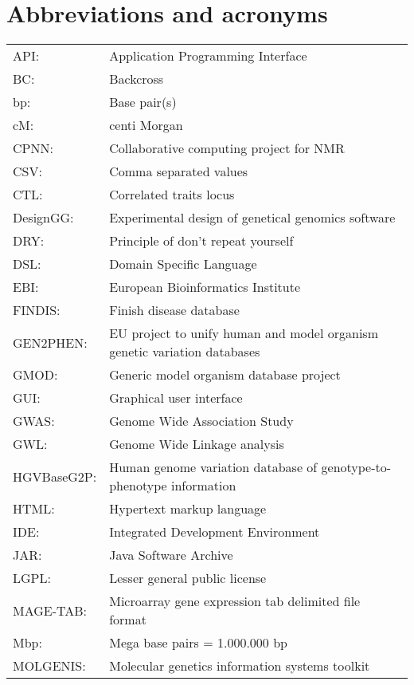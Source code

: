 \documentclass[8pt, twoside]{book}
\begin{document}
\section*{Abbreviations and acronyms}
{\footnotesize
\begin{tabular}{ l l }
API:         & Application Programming Interface\\
BC:          & Backcross \\
bp:          & Base pair(s) \\
cM:          & centi Morgan \\
CPNN:        & Collaborative computing project for NMR\\
CSV:         & Comma separated values\\
CTL:         & Correlated traits locus \\
DesignGG:    & Experimental design of genetical genomics software\\
DRY:         & Principle of don't repeat yourself\\
DSL:         & Domain Specific Language\\
EBI:         & European Bioinformatics Institute\\
FINDIS:      & Finish disease database\\
GEN2PHEN:    & EU project to unify human and model organism genetic variation databases\\
GMOD:        & Generic model organism database project\\
GUI:         & Graphical user interface\\
GWAS:        & Genome Wide Association Study\\
GWL:         & Genome Wide Linkage analysis\\
HGVBaseG2P:  & Human genome variation database of genotype-to-phenotype information\\
HTML:        & Hypertext markup language\\
IDE:         & Integrated Development Environment\\
JAR:         & Java Software Archive\\
LGPL:        & Lesser general public license\\
MAGE-TAB:    & Microarray gene expression tab delimited file format\\
Mbp:         & Mega base pairs = 1.000.000 bp \\
MOLGENIS:    & Molecular genetics information systems toolkit\\

\end{tabular}}
\end{document}

